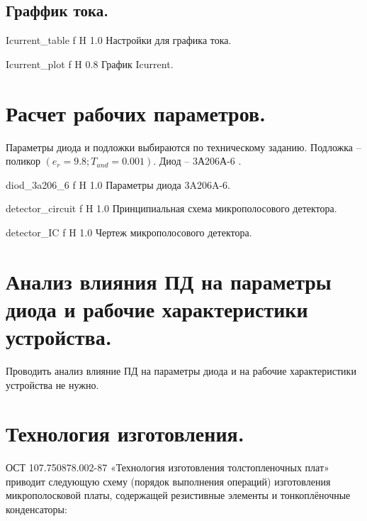 \documentclass{bmstu}
\begin{document}
	\section{Граффик тока.}

	{Icurrent_table}
	{f} %
	{H} %
	{1.0\textwidth} %
	{Настройки для графика тока.} %
	
	{Icurrent_plot}
	{f} %
	{H} %
	{0.8\textwidth} %
	{График Icurrent.} %

	\chapter{Расчет рабочих параметров.}
	
	\indent	Параметры диода и подложки выбираются по техническому заданию. Подложка – 
	поликор $(e_r = 9.8; T_{and} = 0.001)$. Диод – 3А206А-6 \cite{8}.
	
	{diod_3a206_6}
	{f} %
	{H} %
	{1.0\textwidth} %
	{Параметры диода 3A206A-6.} %
	
	{detector_circuit}
	{f} %
	{H} %
	{1.0\textwidth} %
	{Принципиальная схема микрополосового детектора.} %
	
	{detector_IC}
	{f} %
	{H} %
	{1.0\textwidth} %
	{Чертеж микрополосового детектора.} %
	
	\chapter{Анализ влияния ПД на параметры диода и рабочие характеристики устройства.}
	
	Проводить анализ влияние ПД на параметры диода и на рабочие характеристики устройства не нужно.
	
	\chapter{Технология изготовления.} 
	
	ОСТ 107.750878.002-87   «Технология изготовления толстопленочных плат» приводит следующую схему (порядок выполнения операций)  изготовления микрополосковой платы, содержащей резистивные элементы и тонкоплёночные конденсаторы:\\
	
\end{document}
